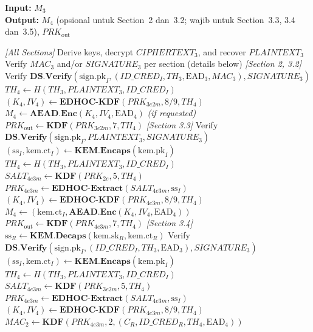 \documentclass{easychair}
\begin{document}
\begin{algorithm}[H]
\caption{Step 4 (\emph{Responder}) --- Memproses $M_3$ dan menyiapkan $M_4$}
\label{alg:step4}
\textbf{Input:} $M_3$ \\
\textbf{Output:} $M_4$ (opsional untuk Section~2 dan~3.2; wajib untuk Section~3.3, 3.4 dan~3.5), $PRK_{\mathrm{out}}$
\begin{algorithmic}[1]
\Statex \textit{[All Sections]}
\State Derive keys, decrypt $CIPHERTEXT_3$, and recover $PLAINTEXT_3$
\State Verify $MAC_3$ and/or $SIGNATURE_3$ per section (details below)
\Statex \textit{[Section 2, 3.2]} 
\State Verify $\mathbf{DS.Verify}(\mathrm{sign.pk}_I, (ID\_CRED_I, TH_3, \mathrm{EAD}_3, MAC_3), SIGNATURE_3)$
\State $TH_4 \gets H(TH_3, PLAINTEXT_3, ID\_CRED_I)$
\State $(K_4, IV_4) \gets \mathbf{EDHOC\text{-}KDF}(PRK_{3e2m}, 8\text{/}9, TH_4)$
\State $M_4 \gets \mathbf{AEAD.Enc}(K_4, IV_4, \mathrm{EAD}_4)$ \quad\textit{(if requested)}
\State $PRK_{\mathrm{out}} \gets \mathbf{KDF}(PRK_{3e2m}, 7, TH_4)$
\Statex \textit{[Section 3.3]} 
\State Verify $\mathbf{DS.Verify}(\mathrm{sign.pk}_I, PLAINTEXT_3, SIGNATURE_3)$
\State $(\mathrm{ss}_I, \mathrm{kem.ct}_I) \gets \mathbf{KEM.Encaps}(\mathrm{kem.pk}_I)$
\State $TH_4 \gets H(TH_3, PLAINTEXT_3, ID\_CRED_I)$
\State $SALT_{4e3m} \gets \mathbf{KDF}(PRK_{2e}, 5, TH_4)$
\State $PRK_{4e3m} \gets \mathbf{EDHOC\text{-}Extract}(SALT_{4e3m}, \mathrm{ss}_I)$
\State $(K_4, IV_4) \gets \mathbf{EDHOC\text{-}KDF}(PRK_{4e3m}, 8\text{/}9, TH_4)$
\State $M_4 \gets (\mathrm{kem.ct}_I, \mathbf{AEAD.Enc}(K_4, IV_4, \mathrm{EAD}_4))$
\State $PRK_{\mathrm{out}} \gets \mathbf{KDF}(PRK_{4e3m}, 7, TH_4)$
\Statex \textit{[Section 3.4]} 
\State $\mathrm{ss}_R \gets \mathbf{KEM.Decaps}(\mathrm{kem.sk}_R, \mathrm{kem.ct}_R)$
\State Verify $\mathbf{DS.Verify}(\mathrm{sign.pk}_I, (ID\_CRED_I, TH_3, \mathrm{EAD}_3), SIGNATURE_3)$
\State $(\mathrm{ss}_I, \mathrm{kem.ct}_I) \gets \mathbf{KEM.Encaps}(\mathrm{kem.pk}_I)$
\State $TH_4 \gets H(TH_3, PLAINTEXT_3, ID\_CRED_I)$
\State $SALT_{4e3m} \gets \mathbf{KDF}(PRK_{3e2m}, 5, TH_4)$
\State $PRK_{4e3m} \gets \mathbf{EDHOC\text{-}Extract}(SALT_{4e3m}, \mathrm{ss}_I)$
\State $(K_4, IV_4) \gets \mathbf{EDHOC\text{-}KDF}(PRK_{4e3m}, 8\text{/}9, TH_4)$
\State $MAC_2 \gets \mathbf{KDF}(PRK_{4e3m}, 2, (C_R, ID\_CRED_R, TH_4, \mathrm{EAD}_4))$

\end{algorithmic}
\end{algorithm}
\end{document}
